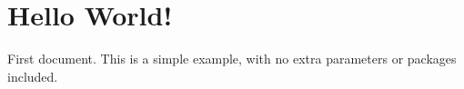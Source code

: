 \documentclass[12pt]{article}
\begin{document}
\thispagestyle{empty}
\vspace*{2in}
\section*{Hello World!}
First document. This is a simple example, with no
extra parameters or packages included.
\end{document}
